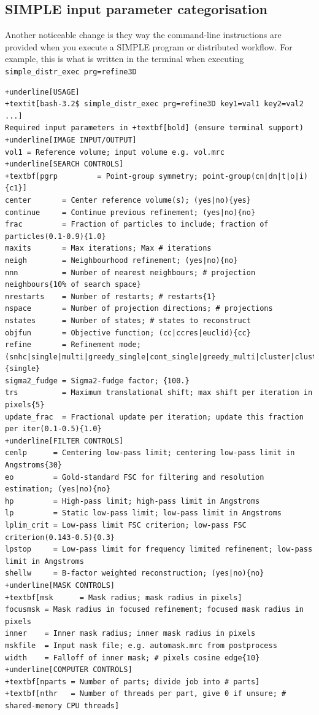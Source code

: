 \documentclass[a4paper,11pt]{article}
\begin{document}
\subsection{SIMPLE input parameter categorisation}
Another noticeable change is they way the command-line instructions are provided when you execute a SIMPLE program or distributed workflow. For example, this is what is written in the terminal when executing \texttt{simple\_distr\_exec prg=refine3D}
\begin{Verbatim}[commandchars=+\[\],fontsize=\small,breaklines=true]
+underline[USAGE]
+textit[bash-3.2$ simple_distr_exec prg=refine3D key1=val1 key2=val2 ...]
Required input parameters in +textbf[bold] (ensure terminal support)
+underline[IMAGE INPUT/OUTPUT]
vol1 = Reference volume; input volume e.g. vol.mrc
+underline[SEARCH CONTROLS]
+textbf[pgrp         = Point-group symmetry; point-group(cn|dn|t|o|i){c1}]
center       = Center reference volume(s); (yes|no){yes}
continue     = Continue previous refinement; (yes|no){no}
frac         = Fraction of particles to include; fraction of particles(0.1-0.9){1.0}
maxits       = Max iterations; Max # iterations
neigh        = Neighbourhood refinement; (yes|no){no}
nnn          = Number of nearest neighbours; # projection neighbours{10% of search space}
nrestarts    = Number of restarts; # restarts{1}
nspace       = Number of projection directions; # projections
nstates      = Number of states; # states to reconstruct
objfun       = Objective function; (cc|ccres|euclid){cc}
refine       = Refinement mode; (snhc|single|multi|greedy_single|cont_single|greedy_multi|cluster|clustersym){single}
sigma2_fudge = Sigma2-fudge factor; {100.}
trs          = Maximum translational shift; max shift per iteration in pixels{5}
update_frac  = Fractional update per iteration; update this fraction per iter(0.1-0.5){1.0}
+underline[FILTER CONTROLS]
cenlp      = Centering low-pass limit; centering low-pass limit in Angstroms{30}
eo         = Gold-standard FSC for filtering and resolution estimation; (yes|no){no}
hp         = High-pass limit; high-pass limit in Angstroms
lp         = Static low-pass limit; low-pass limit in Angstroms
lplim_crit = Low-pass limit FSC criterion; low-pass FSC criterion(0.143-0.5){0.3}
lpstop     = Low-pass limit for frequency limited refinement; low-pass limit in Angstroms
shellw     = B-factor weighted reconstruction; (yes|no){no}
+underline[MASK CONTROLS]
+textbf[msk      = Mask radius; mask radius in pixels]
focusmsk = Mask radius in focused refinement; focused mask radius in pixels
inner    = Inner mask radius; inner mask radius in pixels
mskfile  = Input mask file; e.g. automask.mrc from postprocess
width    = Falloff of inner mask; # pixels cosine edge{10}
+underline[COMPUTER CONTROLS]
+textbf[nparts = Number of parts; divide job into # parts]
+textbf[nthr   = Number of threads per part, give 0 if unsure; # shared-memory CPU threads]
\end{Verbatim}
\end{document}
